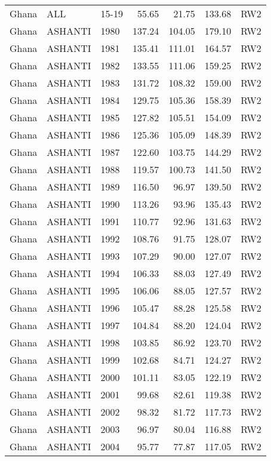\begin{longtable}{lllrrrl}
  Ghana & ALL & 15-19 & 55.65 & 21.75 & 133.68 & RW2 \\ 
  Ghana & ASHANTI & 1980 & 137.24 & 104.05 & 179.10 & RW2 \\ 
  Ghana & ASHANTI & 1981 & 135.41 & 111.01 & 164.57 & RW2 \\ 
  Ghana & ASHANTI & 1982 & 133.55 & 111.06 & 159.25 & RW2 \\ 
  Ghana & ASHANTI & 1983 & 131.72 & 108.32 & 159.00 & RW2 \\ 
  Ghana & ASHANTI & 1984 & 129.75 & 105.36 & 158.39 & RW2 \\ 
  Ghana & ASHANTI & 1985 & 127.82 & 105.51 & 154.09 & RW2 \\ 
  Ghana & ASHANTI & 1986 & 125.36 & 105.09 & 148.39 & RW2 \\ 
  Ghana & ASHANTI & 1987 & 122.60 & 103.75 & 144.29 & RW2 \\ 
  Ghana & ASHANTI & 1988 & 119.57 & 100.73 & 141.50 & RW2 \\ 
  Ghana & ASHANTI & 1989 & 116.50 & 96.97 & 139.50 & RW2 \\ 
  Ghana & ASHANTI & 1990 & 113.26 & 93.96 & 135.43 & RW2 \\ 
  Ghana & ASHANTI & 1991 & 110.77 & 92.96 & 131.63 & RW2 \\ 
  Ghana & ASHANTI & 1992 & 108.76 & 91.75 & 128.07 & RW2 \\ 
  Ghana & ASHANTI & 1993 & 107.29 & 90.00 & 127.07 & RW2 \\ 
  Ghana & ASHANTI & 1994 & 106.33 & 88.03 & 127.49 & RW2 \\ 
  Ghana & ASHANTI & 1995 & 106.06 & 88.05 & 127.57 & RW2 \\ 
  Ghana & ASHANTI & 1996 & 105.47 & 88.28 & 125.58 & RW2 \\ 
  Ghana & ASHANTI & 1997 & 104.84 & 88.20 & 124.04 & RW2 \\ 
  Ghana & ASHANTI & 1998 & 103.85 & 86.92 & 123.70 & RW2 \\ 
  Ghana & ASHANTI & 1999 & 102.68 & 84.71 & 124.27 & RW2 \\ 
  Ghana & ASHANTI & 2000 & 101.11 & 83.05 & 122.19 & RW2 \\ 
  Ghana & ASHANTI & 2001 & 99.68 & 82.61 & 119.38 & RW2 \\ 
  Ghana & ASHANTI & 2002 & 98.32 & 81.72 & 117.73 & RW2 \\ 
  Ghana & ASHANTI & 2003 & 96.97 & 80.04 & 116.88 & RW2 \\ 
  Ghana & ASHANTI & 2004 & 95.77 & 77.87 & 117.05 & RW2 \\ 

\end{longtable}
